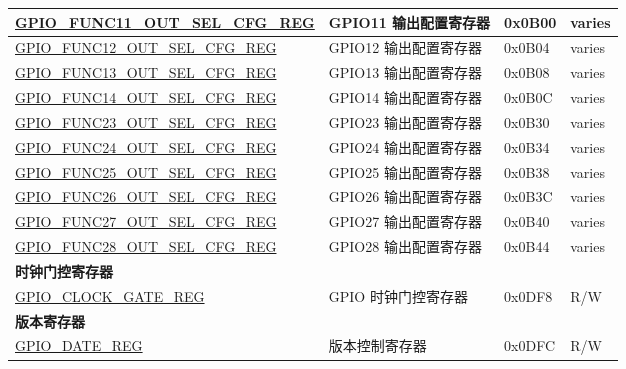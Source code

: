 \begin{longtable}{ | p{6cm} | p{7.2cm} | p{1.3cm} | p{1cm} | }
\hyperref[regdesc:GPIOFUNCNOUTSELCFGREG]{GPIO\_FUNC11\_OUT\_SEL\_CFG\_REG} & GPIO11 输出配置寄存器 & 0x0B00 & varies \\ \hline
\hyperref[regdesc:GPIOFUNCNOUTSELCFGREG]{GPIO\_FUNC12\_OUT\_SEL\_CFG\_REG} & GPIO12 输出配置寄存器 & 0x0B04 & varies \\ \hline
\hyperref[regdesc:GPIOFUNCNOUTSELCFGREG]{GPIO\_FUNC13\_OUT\_SEL\_CFG\_REG} & GPIO13 输出配置寄存器 & 0x0B08 & varies \\ \hline
\hyperref[regdesc:GPIOFUNCNOUTSELCFGREG]{GPIO\_FUNC14\_OUT\_SEL\_CFG\_REG} & GPIO14 输出配置寄存器 & 0x0B0C & varies \\ \hline
\hyperref[regdesc:GPIOFUNCNOUTSELCFGREG]{GPIO\_FUNC23\_OUT\_SEL\_CFG\_REG} & GPIO23 输出配置寄存器 & 0x0B30 & varies \\ \hline
\hyperref[regdesc:GPIOFUNCNOUTSELCFGREG]{GPIO\_FUNC24\_OUT\_SEL\_CFG\_REG} & GPIO24 输出配置寄存器 & 0x0B34 & varies \\ \hline
\hyperref[regdesc:GPIOFUNCNOUTSELCFGREG]{GPIO\_FUNC25\_OUT\_SEL\_CFG\_REG} & GPIO25 输出配置寄存器 & 0x0B38 & varies \\ \hline
\hyperref[regdesc:GPIOFUNCNOUTSELCFGREG]{GPIO\_FUNC26\_OUT\_SEL\_CFG\_REG} & GPIO26 输出配置寄存器 & 0x0B3C & varies \\ \hline
\hyperref[regdesc:GPIOFUNCNOUTSELCFGREG]{GPIO\_FUNC27\_OUT\_SEL\_CFG\_REG} & GPIO27 输出配置寄存器 & 0x0B40 & varies \\ \hline
\hyperref[regdesc:GPIOFUNCNOUTSELCFGREG]{GPIO\_FUNC28\_OUT\_SEL\_CFG\_REG} & GPIO28 输出配置寄存器 & 0x0B44 & varies \\ \hline
\multicolumn{4}{|l|}{\textbf{时钟门控寄存器}} \\ \hline
\hyperref[regdesc:GPIOCLOCKGATEREG]{GPIO\_CLOCK\_GATE\_REG} & GPIO 时钟门控寄存器 & 0x0DF8 & R/W \\ \hline
\multicolumn{4}{|l|}{\textbf{版本寄存器}} \\ \hline
\hyperref[regdesc:GPIODATEREG]{GPIO\_DATE\_REG} & 版本控制寄存器 & 0x0DFC & R/W \\ \hline
\end{longtable}
